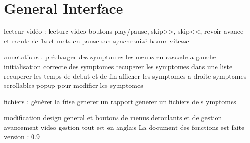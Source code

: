 \documentclass[letterpaper,10pt,english]{sphinxmanual}
\begin{document}
\chapter{General Interface}
\label{\detokenize{general_interface:module-general_interface_V9}}\label{\detokenize{general_interface:general-interface}}\label{\detokenize{general_interface::doc}}\begin{description}
\sphinxAtStartPar
lecteur vidéo :
\sphinxhyphen{} lecture video
\sphinxhyphen{} boutons play/pause, skip\textgreater{}\textgreater{}, skip\textless{}\textless{}, revoir
\sphinxhyphen{} avance et recule de 1s et mets en pause
\sphinxhyphen{} son synchronisé
\sphinxhyphen{} bonne vitesse

\sphinxAtStartPar
annotations :
\sphinxhyphen{} pré\sphinxhyphen{}charger des symptomes
\sphinxhyphen{} les menus en cascade a gauche
\sphinxhyphen{} initialisation correcte des symptomes
\sphinxhyphen{} recuperer les symptomes dans une liste
\sphinxhyphen{} recuperer les temps de debut et de fin
\sphinxhyphen{} afficher les symptomes a droite
\sphinxhyphen{} symptomes scrollables
\sphinxhyphen{} pop\sphinxhyphen{}up pour modifier les symptomes

\sphinxAtStartPar
fichiers :
\sphinxhyphen{} générer la frise
\sphinxhyphen{} generer un rapport
\sphinxhyphen{} générer un fichiers de s ymptomes

\end{description}

\sphinxAtStartPar
modification design general et boutons de menus deroulants et de gestion avancement video gestion
tout est en anglais
La document des fonctions est faite
version : 0.9
\end{document}
